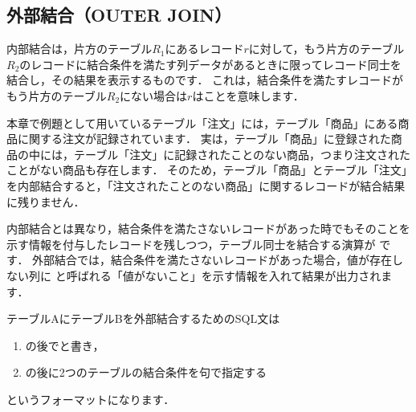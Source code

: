 \subsection{外部結合（OUTER JOIN）}\label{sec:outer-join}
内部結合は，片方のテーブル$R_1$にあるレコード$r$に対して，もう片方のテーブル$R_2$のレコードに結合条件を満たす列データがあるときに限ってレコード同士を結合し，その結果を表示するものです．
これは，結合条件を満たすレコードがもう片方のテーブル$R_2$にない場合は$r$はことを意味します．

本章で例題として用いているテーブル「注文」には，テーブル「商品」にある商品に関する注文が記録されています．
実は，テーブル「商品」に登録された商品の中には，テーブル「注文」に記録されたことのない商品，つまり注文されたことがない商品も存在します．
そのため，テーブル「商品」とテーブル「注文」を内部結合すると，「注文されたことのない商品」に関するレコードが結合結果に残りません．

内部結合とは異なり，結合条件を満たさないレコードがあった時でもそのことを示す情報を付与したレコードを残しつつ，テーブル同士を結合する演算が です．
外部結合では，結合条件を満たさないレコードがあった場合，値が存在しない列に と呼ばれる「値がないこと」を示す情報を入れて結果が出力されます．

テーブルAにテーブルBを外部結合するためのSQL文は
\begin{enumerate}
\item {}の後でと書き，
\item {}の後に2つのテーブルの結合条件を句で指定する
\end{enumerate}
というフォーマットになります．

